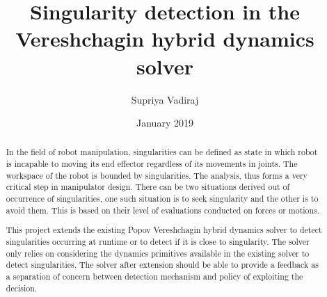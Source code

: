 \documentclass[rnd]{mas_report}
\author{Supriya Vadiraj}
\title{Singularity detection in the Vereshchagin hybrid dynamics solver}
\date{January 2019}
\begin{document}
\begin{titlepage}
    \maketitle
\end{titlepage}


\pagestyle{plain}


\cleardoublepage
\statementpage
%
\begin{abstract}
	In the field of robot manipulation, singularities can be defined as state in which robot is incapable to moving its end effector regardless of its movements in joints. The workspace of the robot is bounded by singularities. The analysis, thus forms a very critical step in manipulator design. There can be two situations derived out of occurrence of singularities, one such situation is to seek singularity and the other is to avoid them. This is based on their level of evaluations conducted on forces or motions.
	
	
	This project extends the existing Popov Vereshchagin hybrid dynamics solver to detect singularities occurring at runtime or to detect if it is close to singularity. The solver only relies on considering the dynamics primitives available in the existing solver to detect singularities. The solver after extension should be able to provide a feedback as a separation of concern between detection mechanism and policy of exploiting the decision. 
	

\end{abstract}
\end{document}
